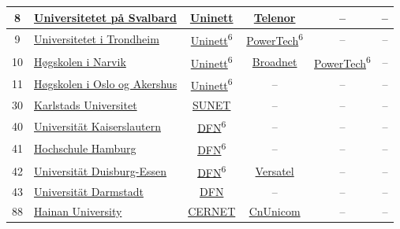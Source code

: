 \begin{small}
\begin{center}
\begin{longtable}{|c|c|c|c|c|c|}
 8 & \multicolumn{1}{|l|}{\index{Universitetet på Svalbard}\index{Site!Universitetet på Svalbard}\hyperref[sec:UNIS]{Universitetet på Svalbard}} & \href{https://www.uninett.no}{Uninett} & \href{https://www.telenor.no}{Telenor} & – & – \\ \hline
 9 & \multicolumn{1}{|l|}{\index{Universitetet i Trondheim}\index{Site!Universitetet i Trondheim}\hyperref[sec:NTNU]{Universitetet i Trondheim}} & \href{https://www.uninett.no}{Uninett}\textsuperscript{6} & \href{http://www.powertech.no}{PowerTech}\textsuperscript{6} & – & – \\ \hline
 10 & \multicolumn{1}{|l|}{\index{Høgskolen i Narvik}\index{Site!Høgskolen i Narvik}\hyperref[sec:HiN]{Høgskolen i Narvik}} & \href{https://www.uninett.no}{Uninett}\textsuperscript{6} & \href{https://www.broadnet.no}{Broadnet} & \href{http://www.powertech.no}{PowerTech}\textsuperscript{6} & – \\ \hline
 11 & \multicolumn{1}{|l|}{\index{Høgskolen i Oslo og Akershus}\index{Site!Høgskolen i Oslo og Akershus}\hyperref[sec:HiOA]{Høgskolen i Oslo og Akershus}} & \href{https://www.uninett.no}{Uninett}\textsuperscript{6} & – & – & – \\ \hline
 30 & \multicolumn{1}{|l|}{\index{Karlstads Universitet}\index{Site!Karlstads Universitet}\hyperref[sec:KAU]{Karlstads Universitet}} & \href{http://www.sunet.se}{SUNET} & – & – & – \\ \hline
 40 & \multicolumn{1}{|l|}{\index{Universität Kaiserslautern}\index{Site!Universität Kaiserslautern}\hyperref[sec:TUKL]{Universität Kaiserslautern}} & \href{https://www.dfn.de}{DFN}\textsuperscript{6} & – & – & – \\ \hline
 41 & \multicolumn{1}{|l|}{\index{Hochschule Hamburg}\index{Site!Hochschule Hamburg}\hyperref[sec:HAW]{Hochschule Hamburg}} & \href{https://www.dfn.de}{DFN}\textsuperscript{6} & – & – & – \\ \hline
 42 & \multicolumn{1}{|l|}{\index{Universität Duisburg-Essen}\index{Site!Universität Duisburg-Essen}\hyperref[sec:UDE]{Universität Duisburg-Essen}} & \href{https://www.dfn.de}{DFN}\textsuperscript{6} & \href{http://www.versatel.de}{Versatel} & – & – \\ \hline
 43 & \multicolumn{1}{|l|}{\index{Universität Darmstadt}\index{Site!Universität Darmstadt}\hyperref[sec:TUDA]{Universität Darmstadt}} & \href{https://www.dfn.de}{DFN} & – & – & – \\ \hline
 88 & \multicolumn{1}{|l|}{\index{Hainan University}\index{Site!Hainan University}\hyperref[sec:HU]{Hainan University}} & \href{http://www.cernet.edu.cn}{CERNET} & \href{http://www.chinaunicom.com}{CnUnicom} & – & – \\ \hline

\end{longtable}
\end{center}
\end{small}
